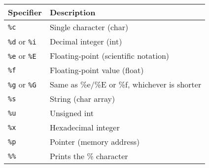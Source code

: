 \documentclass[a4paper, 10pt]{article}
\begin{document}
\begin{center}
    \begin{tabular}{|l|l|}
        \hline
        Specifier                    & Description                                  \\
        \hline
        \texttt{\%c}                 & Single character (char)                      \\
        \hline
        \texttt{\%d} or \texttt{\%i} & Decimal integer (int)                        \\
        \hline
        \texttt{\%e} or \texttt{\%E} & Floating-point (scientific notation)         \\
        \hline
        \texttt{\%f}                 & Floating-point value (float)                 \\
        \hline
        \texttt{\%g} or \texttt{\%G} & Same as \%e/\%E or \%f, whichever is shorter \\
        \hline
        \texttt{\%s}                 & String (char array)                          \\
        \hline
        \texttt{\%u}                 & Unsigned int                                 \\
        \hline
        \texttt{\%x}                 & Hexadecimal integer                          \\
        \hline
        \texttt{\%p}                 & Pointer (memory address)                     \\
        \hline
        \texttt{\%\%}                & Prints the \% character                      \\
        \hline
    \end{tabular}
\end{center}
\pagebreak
\end{document}

